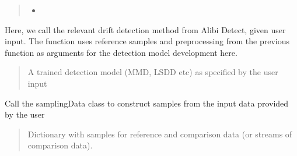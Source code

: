 \documentclass[letterpaper,10pt,english]{sphinxmanual}
\begin{document}
\begin{fulllineitems}
\begin{fulllineitems}
\begin{quote}
\begin{description}
\begin{itemize}
\item {} 
\sphinxAtStartPar
{}

\end{itemize}


\end{description}\end{quote}

\end{fulllineitems}


\begin{fulllineitems}
\label{\detokenize{alibiModules/basicDetectors:basicDetectors.basicDetectors.detector}}
\pysigstartsignatures
{}
\pysigstopsignatures
\sphinxAtStartPar
Here, we call the relevant drift detection method from Alibi Detect, given user input.
The function uses reference samples and preprocessing from the previous function as arguments
for the detection model development here.
\begin{quote}\begin{description}
\sphinxAtStartPar
A trained detection model (MMD, LSDD etc) as specified by the user input

\end{description}\end{quote}

\end{fulllineitems}


\begin{fulllineitems}
\label{\detokenize{alibiModules/basicDetectors:basicDetectors.basicDetectors.embedData}}
\pysigstartsignatures
{}
\pysigstopsignatures
\sphinxAtStartPar
Call the samplingData class to construct samples from the input data provided by the user
\begin{quote}\begin{description}
\sphinxAtStartPar
Dictionary with samples for reference and comparison data (or streams of comparison data).

\end{description}\end{quote}


\end{fulllineitems}
\end{fulllineitems}
\end{document}
